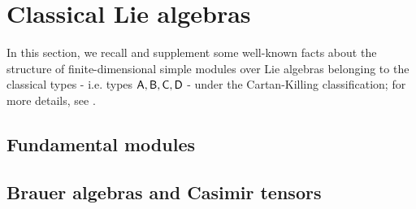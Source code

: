 \section{Classical Lie algebras}
    In this section, we recall and supplement some well-known facts about the structure of finite-dimensional simple modules over Lie algebras belonging to the classical types - i.e. types $\mathsf{A}, \mathsf{B}, \mathsf{C}, \mathsf{D}$ - under the Cartan-Killing classification; for more details, see \cite{carter_affine_lie_algebras}.

    \subsection{Fundamental modules}

    \subsection{Brauer algebras and Casimir tensors}
        
        